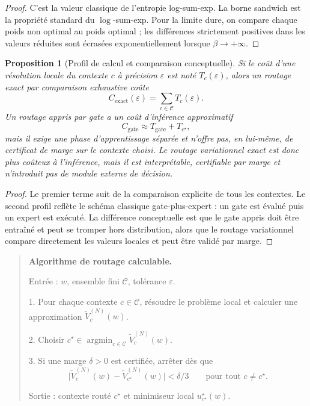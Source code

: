 \documentclass[11pt,a4paper]{article}
\newtheorem{proposition}{Proposition}[section]
\DeclareMathOperator{\argmin}{argmin}
\newcommand{\Ccal}{\mathcal C}
\begin{document}
\begin{proof}
C'est la valeur classique de l'entropie log-sum-exp. La borne sandwich est la propriété standard du \(\log\)-sum-exp. Pour la limite dure, on compare chaque poids non optimal au poids optimal ; les différences strictement positives dans les valeurs réduites sont écrasées exponentiellement lorsque \(\beta\to+\infty\).
\end{proof}

\begin{proposition}[Profil de calcul et comparaison conceptuelle]
Si le coût d'une résolution locale du contexte \(c\) à précision \(\varepsilon\) est noté \(T_c(\varepsilon)\), alors un routage exact par comparaison exhaustive coûte
\[
C_{\mathrm{exact}}(\varepsilon)=\sum_{c\in\Ccal}T_c(\varepsilon).
\]
Un routage appris par gate a un coût d'inférence approximatif
\[
C_{\mathrm{gate}}\approx T_{\mathrm{gate}}+T_{c^\star},
\]
mais il exige une phase d'apprentissage séparée et n'offre pas, en lui-même, de certificat de marge sur le contexte choisi. Le routage variationnel exact est donc plus coûteux à l'inférence, mais il est interprétable, certifiable par marge et n'introduit pas de module externe de décision.
\end{proposition}

\begin{proof}
Le premier terme suit de la comparaison explicite de tous les contextes. Le second profil reflète le schéma classique gate-plus-expert : un gate est évalué puis un expert est exécuté. La différence conceptuelle est que le gate appris doit être entraîné et peut se tromper hors distribution, alors que le routage variationnel compare directement les valeurs locales et peut être validé par marge.
\end{proof}

\begin{quote}
\small
\textbf{Algorithme de routage calculable.}

Entrée : \(w\), ensemble fini \(\Ccal\), tolérance \(\varepsilon\).

1. Pour chaque contexte \(c\in\Ccal\), résoudre le problème local et calculer une approximation \(\widetilde V_c^{(N)}(w)\).

2. Choisir \(c^\star\in\argmin_{c\in\Ccal}\widetilde V_c^{(N)}(w)\).

3. Si une marge \(\delta>0\) est certifiée, arrêter dès que
\[
\bigl|\widetilde V_c^{(N)}(w)-\widetilde V_{c^\star}^{(N)}(w)\bigr|<\delta/3
\qquad\text{pour tout }c\neq c^\star.
\]

Sortie : contexte routé \(c^\star\) et minimiseur local \(u_{c^\star}^\star(w)\).
\end{quote}
\end{document}
